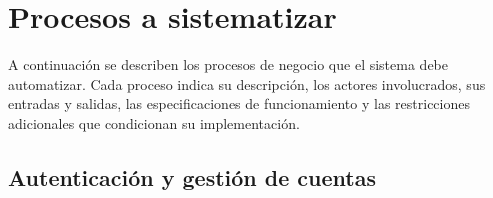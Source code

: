 \documentclass[doc,12pt,a4paper]{apa7}
\begin{document}
\section{Procesos a sistematizar}

A continuación se describen los procesos de negocio que el sistema debe automatizar. Cada proceso indica su descripción, los actores involucrados, sus entradas y salidas, las especificaciones de funcionamiento y las restricciones adicionales que condicionan su implementación.

\subsection{Autenticación y gestión de cuentas}
\end{document}
